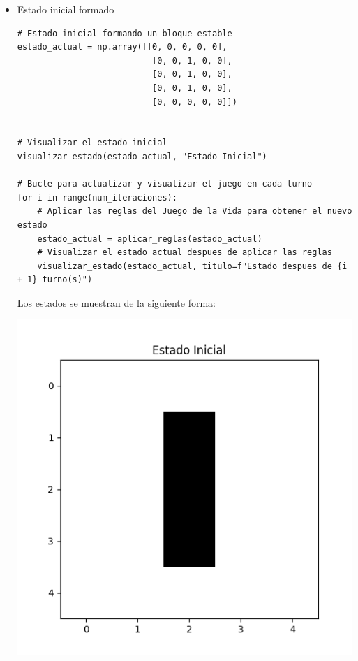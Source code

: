 \begin{itemize}
    \item Estado inicial formado

\begin{lstlisting}
# Estado inicial formando un bloque estable
estado_actual = np.array([[0, 0, 0, 0, 0],
                           [0, 0, 1, 0, 0],
                           [0, 0, 1, 0, 0],
                           [0, 0, 1, 0, 0],
                           [0, 0, 0, 0, 0]]) 


# Visualizar el estado inicial
visualizar_estado(estado_actual, "Estado Inicial")

# Bucle para actualizar y visualizar el juego en cada turno
for i in range(num_iteraciones):
    # Aplicar las reglas del Juego de la Vida para obtener el nuevo estado
    estado_actual = aplicar_reglas(estado_actual)
    # Visualizar el estado actual despues de aplicar las reglas
    visualizar_estado(estado_actual, titulo=f"Estado despues de {i + 1} turno(s)")
\end{lstlisting}
    Los estados se muestran de la siguiente forma:
    \begin{center}
        \includegraphics[scale=0.4]{IMA/ejemplosJuegoVida/ejemplo 2.1.png}

\end{center}
\end{itemize}
